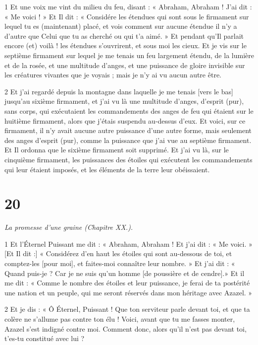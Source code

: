 \par 1 Et une voix me vint du milieu du feu, disant : « Abraham, Abraham ! J'ai dit : « Me voici ! » Et Il dit : « Considére les étendues qui sont sous le firmament sur lequel tu es (maintenant) placé, et vois comment sur aucune étendue il n’y a d’autre que Celui que tu as cherché ou qui t’a aimé. » Et pendant qu’Il ​​parlait encore (et) voilà ! les étendues s'ouvrirent, et sous moi les cieux. Et je vis sur le septième firmament sur lequel je me tenais un feu largement étendu, de la lumière et de la rosée, et une multitude d'anges, et une puissance de gloire invisible sur les créatures vivantes que je voyais ; mais je n'y ai vu aucun autre être.

\par 2 Et j'ai regardé depuis la montagne dans laquelle je me tenais [vers le bas] jusqu'au sixième firmament, et j'ai vu là une multitude d'anges, d'esprit (pur), sans corps, qui exécutaient les commandements des anges de feu qui étaient sur le huitième firmament, alors que j'étais suspendu au-dessus d'eux. Et voici, sur ce firmament, il n'y avait aucune autre puissance d'une autre forme, mais seulement des anges d'esprit (pur), comme la puissance que j'ai vue au septième firmament. Et Il ordonna que le sixième firmament soit supprimé. Et j'ai vu là, sur le cinquième firmament, les puissances des étoiles qui exécutent les commandements qui leur étaient imposés, et les éléments de la terre leur obéissaient.

\chapter{20}

\par \textit{La promesse d'une graine (Chapitre XX.).}

\par 1 Et l'Éternel Puissant me dit : « Abraham, Abraham ! Et j’ai dit : « Me voici. » [Et Il dit :] « Considérez d’en haut les étoiles qui sont au-dessous de toi, et comptez-les [pour moi], et faites-moi connaître leur nombre. » Et j’ai dit : « Quand puis-je ? Car je ne suis qu’un homme [de poussière et de cendre].» Et il me dit : « Comme le nombre des étoiles et leur puissance, je ferai de ta postérité une nation et un peuple, qui me seront réservés dans mon héritage avec Azazel. »

\par 2 Et je dis : « Ô Éternel, Puissant ! Que ton serviteur parle devant toi, et que ta colère ne s'allume pas contre ton élu ! Voici, avant que tu me fasses monter, Azazel s'est indigné contre moi. Comment donc, alors qu’il n’est pas devant toi, t’es-tu constitué avec lui ?

